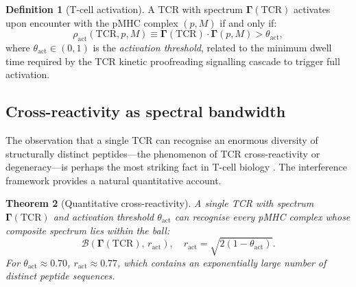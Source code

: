 \documentclass[twocolumn,11pt,a4paper]{article}
\newtheorem{theorem}{Theorem}[section]
\theoremstyle{definition}
\newtheorem{definition}[theorem]{Definition}
\theoremstyle{remark}
\begin{document}
\begin{definition}[T-cell activation]
\label{def:tcr_activation}
A TCR with spectrum $\bm{\Gamma}(\mathrm{TCR})$ activates upon encounter
with the pMHC complex $(p, M)$ if and only if:
\begin{equation}
  \rho_{\mathrm{act}}(\mathrm{TCR}, p, M)
  \equiv \bm{\Gamma}(\mathrm{TCR})\cdot\bm{\Gamma}(p,M) > \theta_{\mathrm{act}},
  \label{eq:tcr_activation}
\end{equation}
where $\theta_{\mathrm{act}} \in (0,1)$ is the \emph{activation threshold},
related to the minimum dwell time required by the TCR kinetic proofreading
signalling cascade to trigger full activation.
\end{definition}

\subsection{Cross-reactivity as spectral bandwidth}
\label{sec:cross_reactivity}

The observation that a single TCR can recognise an enormous diversity of
structurally distinct peptides---the phenomenon of TCR cross-reactivity or
degeneracy---is perhaps the most striking fact in T-cell biology
\citep{mason1998,wooldridge2012}. The interference framework provides a
natural quantitative account.

\begin{theorem}[Quantitative cross-reactivity]
\label{thm:cross_reactivity}
A single TCR with spectrum $\bm{\Gamma}(\mathrm{TCR})$ and activation
threshold $\theta_{\mathrm{act}}$ can recognise every pMHC complex whose
composite spectrum lies within the ball:
\begin{equation}
  \mathcal{B}(\bm{\Gamma}(\mathrm{TCR}),\, r_{\mathrm{act}}),
  \quad r_{\mathrm{act}} = \sqrt{2(1-\theta_{\mathrm{act}})}.
  \label{eq:cross_reactivity_ball}
\end{equation}
For $\theta_{\mathrm{act}} \approx 0.70$, $r_{\mathrm{act}} \approx 0.77$,
which contains an exponentially large number of distinct peptide sequences.
\end{theorem}
\end{document}
